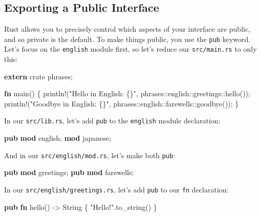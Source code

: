 \documentclass[a4paper,]{book}
\newenvironment{Shaded}{\begin{snugshade}}{\end{snugshade}}
\newcommand{\KeywordTok}[1]{\textcolor[rgb]{0.13,0.29,0.53}{\textbf{{#1}}}}
\newcommand{\StringTok}[1]{\textcolor[rgb]{0.31,0.60,0.02}{{#1}}}
\newcommand{\OtherTok}[1]{\textcolor[rgb]{0.56,0.35,0.01}{{#1}}}
\newcommand{\NormalTok}[1]{{#1}}
\begin{document}
\subsection{Exporting a Public
Interface}\label{exporting-a-public-interface}

Rust allows you to precisely control which aspects of your interface are
public, and so private is the default. To make things public, you use
the \texttt{pub} keyword. Let's focus on the \texttt{english} module
first, so let's reduce our \texttt{src/main.rs} to only this:

\begin{Shaded}
\begin{Highlighting}[]
\KeywordTok{extern} \NormalTok{crate phrases;}

\KeywordTok{fn} \NormalTok{main() \{}
    \OtherTok{println!}\NormalTok{(}\StringTok{"Hello in English: \{\}"}\NormalTok{, phrases::english::greetings::hello());}
    \OtherTok{println!}\NormalTok{(}\StringTok{"Goodbye in English: \{\}"}\NormalTok{, phrases::english::farewells::goodbye());}
\NormalTok{\}}
\end{Highlighting}
\end{Shaded}

In our \texttt{src/lib.rs}, let's add \texttt{pub} to the
\texttt{english} module declaration:

\begin{Shaded}
\begin{Highlighting}[]
\KeywordTok{pub} \KeywordTok{mod} \NormalTok{english;}
\KeywordTok{mod} \NormalTok{japanese;}
\end{Highlighting}
\end{Shaded}

And in our \texttt{src/english/mod.rs}, let's make both \texttt{pub}:

\begin{Shaded}
\begin{Highlighting}[]
\KeywordTok{pub} \KeywordTok{mod} \NormalTok{greetings;}
\KeywordTok{pub} \KeywordTok{mod} \NormalTok{farewells;}
\end{Highlighting}
\end{Shaded}

In our \texttt{src/english/greetings.rs}, let's add \texttt{pub} to our
\texttt{fn} declaration:

\begin{Shaded}
\begin{Highlighting}[]
\KeywordTok{pub} \KeywordTok{fn} \NormalTok{hello() -> String \{}
    \StringTok{"Hello!"}\NormalTok{.to_string()}
\NormalTok{\}}
\end{Highlighting}
\end{Shaded}
\end{document}
